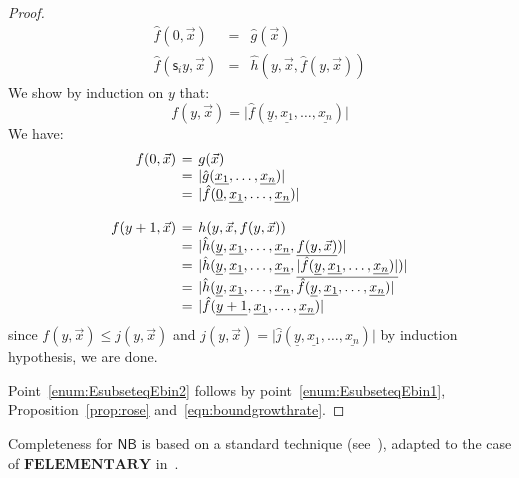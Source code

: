 \documentclass[manuscript,screen]{acmart}
\theoremstyle{definition}
\theoremstyle{remark}
\newcommand{\elementary}{\mathbf{ELEMENTARY}}
\newcommand{\f}{\mathbf{F}}
\newcommand{\felementary}{\f\elementary}
\newcommand{\num}[1]{\underline{#1}}
\renewcommand{\succ}[1]{\mathsf{s}_{#1}}
\newcommand{\s}[1]{\vert {#1}\vert}
\newcommand{\bc}{\mathsf{B}}
\newcommand{\nested}{\mathsf{N}}
\newcommand{\nbc}{\nested\bc}
\begin{document}
\begin{proof}
\begin{equation*}
        \begin{array}{rcl}
              \hat{f}(0, \vec{x})&=&\hat{g}(\vec{x})\\
              \hat{f}(\succ iy, \vec{x})&=& \hat{h}(y, \vec{x}, \hat{f}(y, \vec{x}))
        \end{array}
    \end{equation*}
We show by induction on $y$ that:     
    \begin{equation*}
   f(y, \vec x)= \s{\hat{f}(\num{y}, \num{x_1}, \ldots, \num{x_n})}
\end{equation*}
We have:
\begin{equation*}
\arraycolsep=2pt
    \begin{array}{rcl}
  f(0, \vec x)&=& g(\vec x)\\
  &=&\s{\hat{g}(\num{x_1}, \ldots, \num{x_n})}\\
  &=&
    \s{\hat{f}(\num{0}, \num{x_1}, \ldots, \num{x_n})}\\ \\
    f(y+1, \vec x)&=& h(y,\vec x, f(y, \vec x))\\
    &=& \s{\hat{h}(\num{y}, \num{x_1}, \ldots, \num{x_n}, \num{f(y, \vec x)})}\\
    &=& \s{\hat{h}(\num{y}, \num{x_1}, \ldots, \num{x_n}, \num{\s{\hat{f}(\num{y}, \num{x_1}, \ldots, \num{x_n})}})}\\
     &=& \s{\hat{h}(\num{y}, \num{x_1}, \ldots, \num{x_n}, \hat{f}(\num{y}, \num{x_1}, \ldots, \num{x_n})}\\
    &=& \s{\hat{f}(\num{y+1}, \num{x_1}, \ldots, \num{x_n})}
   \end{array}
\end{equation*}
since    $f(y, \vec{x})\leq j(y, \vec{x})$ and $ j(y, \vec x)= \s{\hat{j}(\num{y}, \num{x_1}, \ldots, \num{x_n})}$  by induction hypothesis, we are done.     
    
    
    
     Point~\ref{enum:EsubseteqEbin2} follows by point~\ref{enum:EsubseteqEbin1},  Proposition~\ref{prop:rose} and~\eqref{eqn:boundgrowthrate}.
\end{proof}



Completeness for $\nbc$ is based on a standard technique (see~\cite{BellantoniCook}),  adapted to the case of $\felementary$  in~\cite{Wirz99characterizingthe}.
\end{document}
